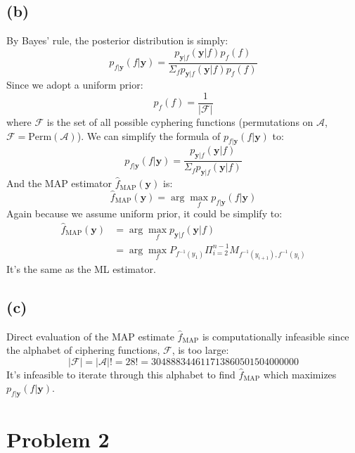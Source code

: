 \documentclass[12pt]{article}
\begin{document}
\subsection{(b)}
By Bayes' rule, the posterior distribution is simply:
\begin{equation}
	p_{f|\mathbf{y}}(f|\mathbf{y}) = \frac{p_{\mathbf{y}|f}(\mathbf{y}|f)p_{f}(f)}{\Sigma_{f}p_{\mathbf{y}|f}(\mathbf{y}|f)p_{f}(f)}
\end{equation}
Since we adopt a uniform prior:
\begin{equation}
	p_{f}(f) = \frac{1}{|\mathcal{F}|}
\end{equation}
where $\mathcal{F}$ is the set of all possible cyphering functions (permutations on $\mathcal{A}$, $\mathcal{F}=\text{Perm}(\mathcal{A})$). We can simplify the formula of $p_{f|\mathbf{y}}(f|\mathbf{y})$ to:
\begin{equation}
p_{f|\mathbf{y}}(f|\mathbf{y}) = \frac{p_{\mathbf{y}|f}(\mathbf{y}|f)}{\Sigma_{f}p_{\mathbf{y}|f}(\mathbf{y}|f)}
\end{equation}
And the MAP estimator $\hat{f}_{\text{MAP}}(\mathbf{y})$ is:
\begin{equation}
	\hat{f}_{\text{MAP}}(\mathbf{y}) = \arg\max_{f}p_{f|\mathbf{y}}(f|\mathbf{y})
\end{equation}
Again because we assume uniform prior, it could be simplify to:
\begin{equation}
\begin{split}
	\hat{f}_{\text{MAP}}(\mathbf{y}) & = \arg\max_{f}p_{\mathbf{y}|f}(\mathbf{y}|f) \\ & = \arg\max_{f}P_{f^{-1}(y_1)}\Pi_{i=2}^{n-1}M_{f^{-1}(y_{i+1}),f^{-1}(y_i)}
\end{split}
\end{equation}
It's the same as the ML estimator.

\subsection{(c)}
Direct evaluation of the MAP estimate $\hat{f}_{\text{MAP}}$ is computationally infeasible since the alphabet of ciphering functions, $\mathcal{F}$, is too large:
\begin{equation}
	|\mathcal{F}| = |\mathcal{A}|! = 28! = 304888344611713860501504000000
\end{equation}
It's infeasible to iterate through this alphabet to find $\hat{f}_{\text{MAP}}$ which maximizes $p_{f|\mathbf{y}}(f|\mathbf{y})$.


\section{Problem 2}
\end{document}
